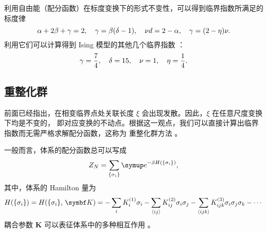 %
%

利用自由能（配分函数）在标度变换下的形式不变性，可以得到临界指数所满足的标度律
\cite{pathria,linzonghan}
\begin{equation}
  \alpha + 2\beta + \gamma = 2 \qc
  \gamma = \beta (\delta - 1)  \qc
  \nu d = 2 - \alpha           \qc
  \gamma = (2-\eta) \nu.
\end{equation}
利用它们可以计算得到 Ising 模型的其他几个临界指数 \cite{pathria,linzonghan}：
\begin{equation}
  \gamma = \frac{7}{4} \qc
  \delta = 15          \qc
  \nu    = 1           \qc
  \eta   = \frac{1}{4}.
\end{equation}

\subsection{重整化群}

前面已经指出，在相变临界点处关联长度 $\xi$ 会出现发散。因此，$\xi$ 在任意尺度变换下均是不变的，
即对应变换的不动点。根据这一观点，我们可以直接计算出临界指数而无需严格求解配分函数，这称为
重整化群方法 \cite{linzonghan}。

一般而言，体系的配分函数总可以写成
\begin{equation}
  Z_N = \sum_\q{\sigma_i} \ee^{-\beta H(\q{\sigma_i})},
\end{equation}
其中，体系的 Hamilton 量为
\begin{equation}
    H(\q{\sigma_i})
  = H(\q{\sigma_i},\,\bm{K})
  = - \sum_i K^{(1)}_i \sigma_i
    - \sum_{\nearest{ij}}  K^{(2)}_{ij}  \sigma_i\sigma_j
    - \sum_{\nearest{ijk}} K^{(3)}_{ijk} \sigma_i\sigma_j\sigma_k - \cdots
\end{equation}
耦合参数 $\bm{K}$ 可以表征体系中的多种相互作用 \cite{pathria,surukeng}。

